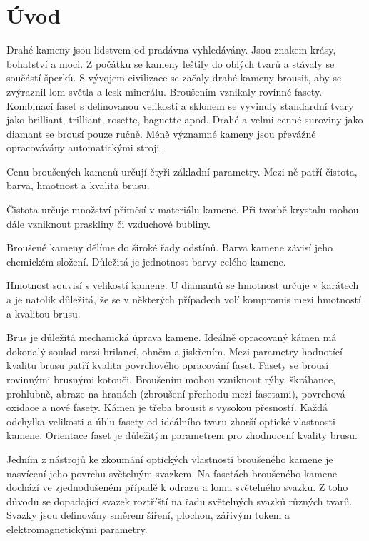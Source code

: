 \chapter{Úvod}

Drahé kameny jsou lidstvem od pradávna vyhledávány.
Jsou znakem krásy, bohatství a moci. Z počátku se kameny leštily do oblých tvarů a stávaly se součástí šperků.
S vývojem civilizace se začaly drahé kameny brousit, aby se zvýraznil lom světla a lesk minerálu. Broušením vznikaly rovinné fasety. Kombinací faset s definovanou velikostí a sklonem se vyvinuly standardní tvary jako brilliant, trilliant, rosette, baguette apod. Drahé a velmi cenné suroviny jako diamant se brousí pouze ručně. Méně významné kameny jsou převážně opracovávány automatickými stroji.  

Cenu broušených kamenů určují čtyři základní parametry. Mezi ně patří čistota, barva, hmotnost a kvalita brusu. 

Čistota určuje množství příměsí v materiálu kamene. Při tvorbě krystalu mohou dále vzniknout praskliny či vzduchové bubliny.

Broušené kameny dělíme do široké řady odstínů. Barva kamene závisí jeho chemickém složení. Důležitá je jednotnost barvy celého kamene.

Hmotnost souvisí s velikostí kamene. U diamantů se hmotnost určuje v karátech a je natolik důležitá, že se v některých případech volí kompromis mezi hmotností a kvalitou brusu.

Brus je důležitá mechanická úprava kamene. Ideálně opracovaný kámen má dokonalý soulad mezi brilancí, ohněm a jiskřením. Mezi parametry hodnotící kvalitu brusu patří kvalita povrchového opracování faset. Fasety se brousí rovinnými brusnými kotouči. Broušením mohou vzniknout rýhy, škrábance, prohlubně, abraze na hranách (zbroušení přechodu mezi fasetami), povrchová oxidace a nové fasety. Kámen je třeba brousit s vysokou přesností. Každá odchylka velikosti a úhlu fasety od ideálního tvaru zhorší optické vlastnosti kamene. Orientace faset je důležitým parametrem pro zhodnocení kvality brusu.

Jedním z nástrojů ke zkoumání optických vlastností broušeného kamene je nasvícení jeho povrchu světelným svazkem. Na fasetách broušeného kamene dochází ve zjednodušeném případě k odrazu a lomu světelného svazku. Z toho důvodu se dopadající svazek roztříští na řadu světelných svazků různých tvarů. Svazky jsou definovány směrem šíření, plochou, zářivým tokem a elektromagnetickými parametry. 

